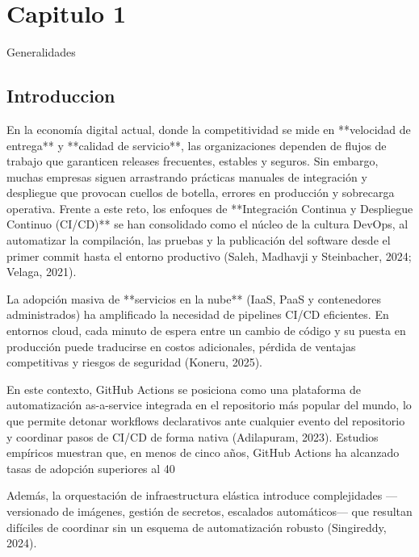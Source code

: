 \chapter{Capitulo 1}
Generalidades

\section{Introduccion}

En la economía digital actual, donde la competitividad se mide en **velocidad de entrega** y **calidad de servicio**, las organizaciones dependen de flujos de trabajo que garanticen releases frecuentes, estables y seguros. Sin embargo, muchas empresas siguen arrastrando prácticas manuales de integración y despliegue que provocan cuellos de botella, errores en producción y sobrecarga operativa. Frente a este reto, los enfoques de **Integración Continua y Despliegue Continuo (CI/CD)** se han consolidado como el núcleo de la cultura DevOps, al automatizar la compilación, las pruebas y la publicación del software desde el primer commit hasta el entorno productivo (Saleh, Madhavji y Steinbacher, 2024; Velaga, 2021).

La adopción masiva de **servicios en la nube** (IaaS, PaaS y contenedores administrados) ha amplificado la necesidad de pipelines CI/CD eficientes. En entornos cloud, cada minuto de espera entre un cambio de código y su puesta en producción puede traducirse en costos adicionales, pérdida de ventajas competitivas y riesgos de seguridad (Koneru, 2025). 

En este contexto, GitHub Actions se posiciona como una plataforma de automatización as-a-service integrada en el repositorio más popular del mundo, lo que permite detonar workflows declarativos ante cualquier evento del repositorio y coordinar pasos de CI/CD de forma nativa (Adilapuram, 2023). Estudios empíricos muestran que, en menos de cinco años, GitHub Actions ha alcanzado tasas de adopción superiores al 40 %

Además, la orquestación de infraestructura elástica introduce complejidades —versionado de imágenes, gestión de secretos, escalados automáticos— que resultan difíciles de coordinar sin un esquema de automatización robusto (Singireddy, 2024).

